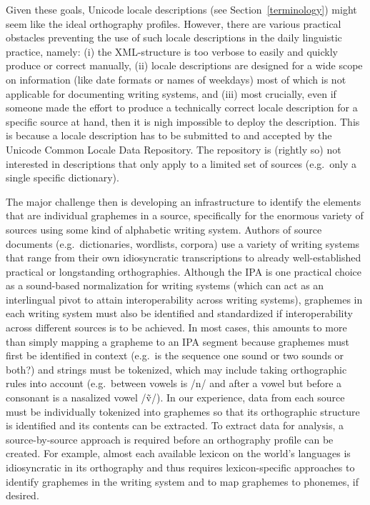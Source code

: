 Given these goals, Unicode locale descriptions (see Section~\ref{terminology})
might seem like the ideal orthography profiles. However, there are various
practical obstacles preventing the use of such locale descriptions in the daily
linguistic practice, namely: (i) the XML-structure is too verbose to easily and
quickly produce or correct manually, (ii) locale descriptions are designed for a
wide scope on information (like date formats or names of weekdays) most of which
is not applicable for documenting writing systems, and (iii) most crucially,
even if someone made the effort to produce a technically correct locale
description for a specific source at hand, then it is nigh impossible to deploy
the description. This is because a locale description has to be submitted to and
accepted by the Unicode Common Locale Data Repository. The repository is
(rightly so) not interested in descriptions that only apply to a limited set of
sources (e.g.~only a single specific dictionary).

The major challenge then is developing an infrastructure to identify the
elements that are individual graphemes in a source, specifically for the
enormous variety of sources using some kind of alphabetic writing system.
Authors of source documents (e.g.~dictionaries, wordlists, corpora) use a
variety of writing systems that range from their own idiosyncratic
transcriptions to already well-established practical or longstanding
orthographies. Although the IPA is one practical choice as a sound-based
normalization for writing systems (which can act as an interlingual pivot to
attain interoperability across writing systems), graphemes in each writing
system must also be identified and standardized if interoperability across
different sources is to be achieved. In most cases, this amounts to more than
simply mapping a grapheme to an IPA segment because graphemes must first be
identified in context (e.g.~is the sequence one sound or two sounds or both?)
and strings must be tokenized, which may include taking orthographic rules into
account (e.g.~between vowels is /n/ and after a vowel but before a consonant is
a nasalized vowel /ṽ/). In our experience, data from each source must be
individually tokenized into graphemes so that its orthographic structure is
identified and its contents can be extracted. To extract data for analysis, a
source-by-source approach is required before an orthography profile can be
created. For example, almost each available lexicon on the world's languages is
idiosyncratic in its orthography and thus requires lexicon-specific approaches
to identify graphemes in the writing system and to map graphemes to phonemes, if
desired.

